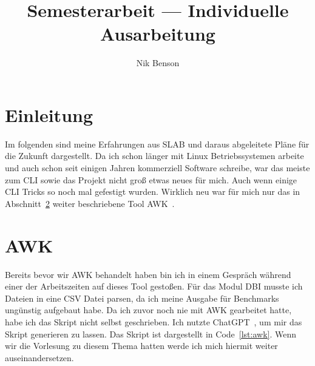 \documentclass[12pt]{article}
\title{Semesterarbeit --- Individuelle Ausarbeitung}
\author[1]{Nik Benson}
\affil[1]{\href{mailto:nik.benson@studmail.w-hs.de}{nik.benson@studmail.w-hs.de}}
\begin{document}
    

    \setcounter{page}{2}
    \tableofcontents
    \listoffigures
    \listoftables
    \lstlistoflistings
    \newpage

    \section{Einleitung}\label{sec:einleitung}
        Im folgenden sind meine Erfahrungen aus SLAB und daraus abgeleitete Pläne für die Zukunft dargestellt.
        Da ich schon länger mit Linux Betriebssystemen arbeite und auch schon seit einigen Jahren kommerziell Software schreibe, war das meiste zum CLI sowie das Projekt nicht groß etwas neues für mich.
        Auch wenn einige CLI Tricks so noch mal gefestigt wurden.
        Wirklich neu war für mich nur das in Abschnitt~\ref{sec:awk} weiter beschriebene Tool AWK~.


    \section{AWK}\label{sec:awk}
        Bereits bevor wir AWK behandelt haben bin ich in einem Gespräch während einer der Arbeitszeiten auf dieses Tool gestoßen.
        Für das Modul DBI musste ich  Dateien in eine CSV Datei parsen, da ich meine Ausgabe für Benchmarks ungünstig aufgebaut habe.
        Da ich zuvor noch nie mit AWK gearbeitet hatte, habe ich das Skript nicht selbst geschrieben.
        Ich nutzte ChatGPT~\autocite{openai-2023}, um mir das Skript generieren zu lassen.
        Das Skript ist dargestellt in Code~\ref{lst:awk}.
        Wenn wir die Vorlesung zu diesem Thema hatten werde ich mich hiermit weiter auseinandersetzen.
        
\end{document}

